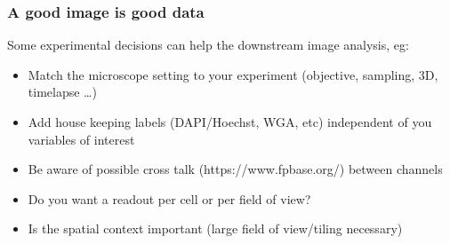 \documentclass[ignorenonframetext,aspectratio=169,10pt,xcolor=table]{beamer}
\begin{document}
\begin{frame} \frametitle{A good image is good data}
  Some experimental decisions can help the downstream image analysis, eg:
  \begin{itemize}
    \item Match the microscope setting to your experiment (objective, sampling, 3D, timelapse \dots)
    \item Add house keeping labels (DAPI/Hoechst, WGA, etc) independent of you variables of interest
    \item Be aware of possible cross talk (https://www.fpbase.org/) between channels
    \item Do you want a readout per cell or per field of view?
    \item Is the spatial context important (large field of view/tiling necessary)
  \end{itemize}
\end{frame}
\end{document}
